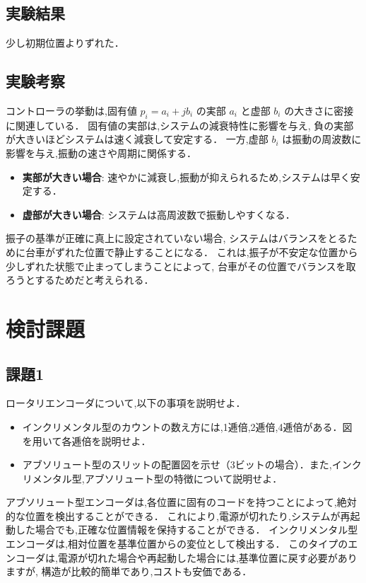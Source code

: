 \subsection{実験結果}
少し初期位置よりずれた．

\subsection{実験考察}
コントローラの挙動は,固有値 \( p_i = a_i + jb_i \) の実部 \( a_i \) と虚部 \( b_i \) 
の大きさに密接に関連している．
固有値の実部は,システムの減衰特性に影響を与え,
負の実部が大きいほどシステムは速く減衰して安定する．
一方,虚部 \( b_i \) は振動の周波数に影響を与え,振動の速さや周期に関係する．

\begin{itemize}
  \item \textbf{実部が大きい場合}: 速やかに減衰し,振動が抑えられるため,システムは早く安定する．
  \item \textbf{虚部が大きい場合}: システムは高周波数で振動しやすくなる．
\end{itemize}

振子の基準が正確に真上に設定されていない場合,
システムはバランスをとるために台車がずれた位置で静止することになる．
これは,振子が不安定な位置から少しずれた状態で止まってしまうことによって,
台車がその位置でバランスを取ろうとするためだと考えられる．

\section{検討課題}

\subsection*{課題1}
ロータリエンコーダについて,以下の事項を説明せよ．
\begin{itemize}
  \item インクリメンタル型のカウントの数え方には,1逓倍,2逓倍,4逓倍がある．図を用いて各逓倍を説明せよ．
  \item アブソリュート型のスリットの配置図を示せ（3ビットの場合）．また,インクリメンタル型,アブソリュート型の特徴について説明せよ．
\end{itemize}

アブソリュート型エンコーダは,各位置に固有のコードを持つことによって,絶対的な位置を検出することができる．
これにより,電源が切れたり,システムが再起動した場合でも,正確な位置情報を保持することができる．
インクリメンタル型エンコーダは,相対位置を基準位置からの変位として検出する．
このタイプのエンコーダは,電源が切れた場合や再起動した場合には,基準位置に戻す必要がありますが,
構造が比較的簡単であり,コストも安価である．

